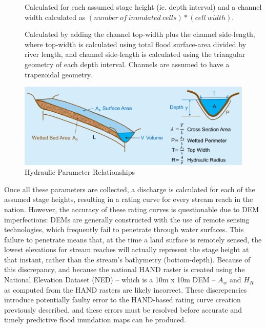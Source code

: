 \documentclass[11pt]{article}
\begin{document}
\begin{description}
  \item[] Calculated for each assumed stage height (ie. depth interval) and a channel width calculated as $(number~of~inundated~cells)*(cell~width)$.
  \item[] Calculated by adding the channel top-width plus the channel side-length, where top-width is calculated using total flood surface-area divided by river length, and channel side-length is calculated using the triangular geometry of each depth interval. Channels are assumed to have a trapezoidal geometry. 
\end{description}

\begin{figure}[b]
  \centering
  \includegraphics[keepaspectratio, width=.8\textwidth]{hydroparams.png}
  \caption{Hydraulic Parameter Relationships \cite{nfiehand}}\label{fig:nfiehand}
\end{figure}

Once all these parameters are collected, a discharge is calculated for each of the assumed stage heights, resulting in a rating curve for every stream reach in the nation. However, the accuracy of these rating curves is questionable due to DEM imperfections: DEMs are generally constructed with the use of remote sensing technologies, which frequently fail to penetrate through water surfaces. This failure to penetrate means that, at the time a land surface is remotely sensed, the lowest elevations for stream reaches will actually represent the stage height at that instant, rather than the stream's bathymetry (bottom-depth). Because of this discrepancy, and because the national HAND raster is created using the National Elevation Dataset (NED) -- which is a 10m x 10m DEM -- $A_w$ and $H_R$ as computed from the HAND rasters are likely incorrect. These discrepencies introduce potentially faulty error to the HAND-based rating curve creation previously described, and these errors must be resolved before accurate and timely predictive flood inundation maps can be produced. 

\end{document}
